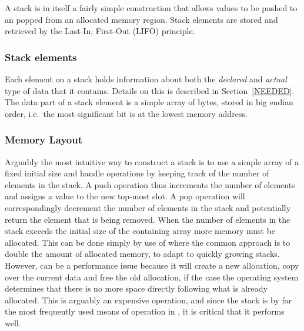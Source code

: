 A stack is in itself a fairly simple construction that allows values to be
pushed to an popped from an allocated memory region. Stack elements are stored
and retrieved by the Last-In, First-Out (LIFO) principle.

\subsubsection{Stack elements}

Each element on a stack holds information about both the \textit{declared} and
\textit{actual} type of data that it contains. Details on this is described in
Section~\ref{NEEDED}. The data part of a stack element is a simple array of
bytes, stored in big endian order, i.e.~the most significant bit is at the
lowest memory address.

\subsubsection{Memory Layout}

Arguably the most intuitive way to construct a stack is to use a simple array of
a fixed initial size and handle operations by keeping track of the number of
elements in the stack. A push operation thus increments the number of elements
and assigns a value to the new top-most slot. A pop operation will
correspondingly decrement the number of elements in the stack and potentially
return the element that is being removed. When the number of elements in the
stack exceeds the initial size of the containing array more memory must be
allocated. This can be done simply by use of  where the common
approach is to double the amount of allocated memory, to adapt to quickly
growing stacks. However,  can be a performance issue because it
will create a new allocation, copy over the current data and free the old
allocation, if the case the operating system determines that there is no more
space directly following what is already allocated\cite{man-realloc}. This is
arguably an expensive operation, and since the stack is by far the most
frequently used means of operation in \thename{}, it is critical that it
performs well.

